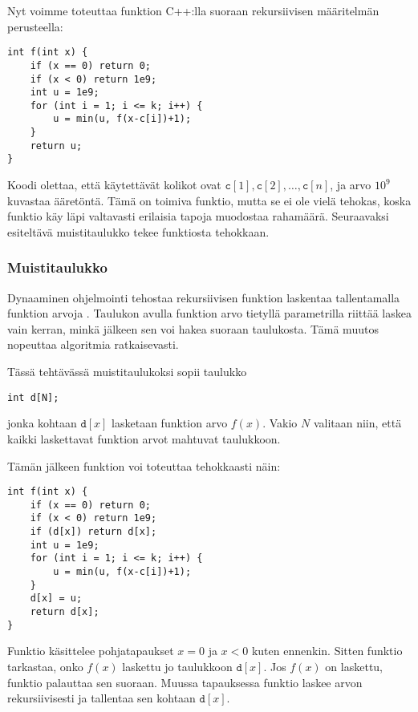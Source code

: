 Nyt voimme toteuttaa funktion C++:lla suoraan
rekursiivisen määritelmän perusteella:

\begin{lstlisting}
int f(int x) {
    if (x == 0) return 0;
    if (x < 0) return 1e9;
    int u = 1e9;
    for (int i = 1; i <= k; i++) {
        u = min(u, f(x-c[i])+1);
    }
    return u;
}
\end{lstlisting}

Koodi olettaa, että käytettävät kolikot ovat
$\texttt{c}[1], \texttt{c}[2], \ldots, \texttt{c}[n]$,
ja arvo $10^9$ kuvastaa ääretöntä.
Tämä on toimiva funktio, mutta se ei ole vielä tehokas,
koska funktio käy läpi valtavasti erilaisia tapoja
muodostaa rahamäärä.
Seuraavaksi esiteltävä muistitaulukko tekee
funktiosta tehokkaan.

\subsubsection{Muistitaulukko}


Dynaaminen ohjelmointi tehostaa
rekursiivisen funktion laskentaa
tallentamalla funktion arvoja .
Taulukon avulla funktion arvo
tietyllä parametrilla riittää laskea
vain kerran, minkä jälkeen sen voi
hakea suoraan taulukosta.
Tämä muutos nopeuttaa algoritmia ratkaisevasti.

Tässä tehtävässä muistitaulukoksi sopii taulukko

\begin{lstlisting}
int d[N];
\end{lstlisting}

jonka kohtaan $\texttt{d}[x]$
lasketaan funktion arvo $f(x)$.
Vakio $N$ valitaan niin, että kaikki
laskettavat funktion arvot mahtuvat taulukkoon.

Tämän jälkeen funktion voi toteuttaa
tehokkaasti näin:

\begin{lstlisting}
int f(int x) {
    if (x == 0) return 0;
    if (x < 0) return 1e9;
    if (d[x]) return d[x];
    int u = 1e9;
    for (int i = 1; i <= k; i++) {
        u = min(u, f(x-c[i])+1);
    }
    d[x] = u;
    return d[x];
}
\end{lstlisting}

Funktio käsittelee pohjatapaukset $x=0$
ja $x<0$ kuten ennenkin.
Sitten funktio tarkastaa,
onko $f(x)$ laskettu jo taulukkoon $\texttt{d}[x]$.
Jos $f(x)$ on laskettu,
funktio palauttaa sen suoraan.
Muussa tapauksessa funktio laskee arvon rekursiivisesti
ja tallentaa sen kohtaan $\texttt{d}[x]$.

